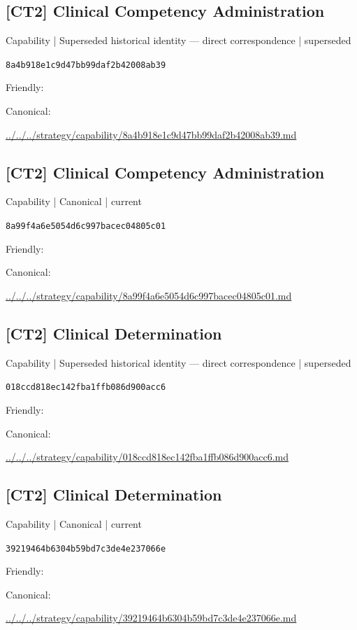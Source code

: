 \documentclass[10pt,a4paper]{article}
\begin{document}
\subsection*{[CT2] Clinical Competency Administration}
{\small Capability | Superseded historical identity — direct correspondence | superseded}\par
\texttt{8a4b918e1c9d47bb99daf2b42008ab39}\par
Friendly: \par
Canonical: \par
{\footnotesize\url{../../../strategy/capability/8a4b918e1c9d47bb99daf2b42008ab39.md}}\par
\subsection*{[CT2] Clinical Competency Administration}
{\small Capability | Canonical | current}\par
\texttt{8a99f4a6e5054d6c997bacec04805c01}\par
Friendly: \par
Canonical: \par
{\footnotesize\url{../../../strategy/capability/8a99f4a6e5054d6c997bacec04805c01.md}}\par
\subsection*{[CT2] Clinical Determination}
{\small Capability | Superseded historical identity — direct correspondence | superseded}\par
\texttt{018ccd818ec142fba1ffb086d900acc6}\par
Friendly: \par
Canonical: \par
{\footnotesize\url{../../../strategy/capability/018ccd818ec142fba1ffb086d900acc6.md}}\par
\subsection*{[CT2] Clinical Determination}
{\small Capability | Canonical | current}\par
\texttt{39219464b6304b59bd7c3de4e237066e}\par
Friendly: \par
Canonical: \par
{\footnotesize\url{../../../strategy/capability/39219464b6304b59bd7c3de4e237066e.md}}\par
\end{document}
